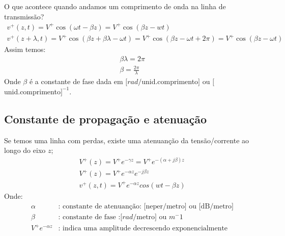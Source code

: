 \documentclass[11pt,a4paper]{article}
\begin{document}
O que acontece quando andamos um comprimento de onda na linha de transmissão?
\begin{align*}
  v^+(z,t)= V^+ \cos( \omega t - \beta z ) = V^+ \cos (\beta z - wt) \\
  v^+ (z+ \lambda, t) = V^+ \cos( \beta z + \beta \lambda- \omega t )= V^+ \cos ( \beta z - \omega t + 2\pi )= V^+ \cos(\beta z - \omega t)
\end{align*}
Assim temos:
\begin{align*}
  \beta \lambda= 2 \pi \\
  \beta = \frac{2\pi}{\lambda}
\end{align*}
Onde $\beta$ é a constante de fase dada em $[rad/$unid.comprimento$]$ ou $[$unid.comprimento$]^{-1}$.

\subsection{Constante de propagação e atenuação}
Se temos uma linha com perdas, existe uma atenuanção da tensão/corrente ao longo do eixo $z$;
\begin{align*}
  V^+ (z) = V^+ e^{-\gamma z} = V^+ e^{-(\alpha +j\beta)z}\\
  V^+ (z) = V^+ e^{-\alpha z} e^{-j \beta z}\\
  v^+ (z,t) = V^+ e^{-\alpha z} cos(wt -\beta z)
\end{align*}
Onde:
\begin{align*}
  \alpha& \text{: constante de atenuanção: [neper/metro] ou [dB/metro]}\\ 
  \beta&\text{: constante de fase :}[rad/\text{metro] ou }m^-1  \\
  V^+ e^{-\alpha z}&\text{: indica uma amplitude decrescendo exponencialmente}
\end{align*}
\end{document}
